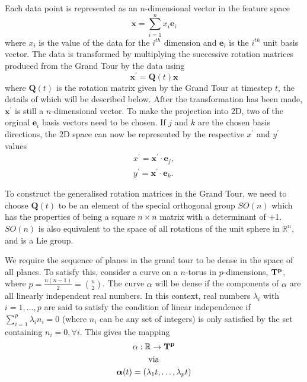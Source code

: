 \documentclass[a4paper,11pt,twoside]{article}
\begin{document}
Each data point is represented as an $n$-dimensional vector in the feature space
\begin{equation}
\bm{x}=\sum_{i=1}^n x_i \bm{e}_i 
\end{equation}
where $x_i$ is the value of the data for the $i^{th}$ dimension and $\bm{e}_i$ is the $i^{th}$ unit basis vector. The data is transformed by multiplying the successive rotation matrices produced from the Grand Tour by the data using
\begin{equation}
\bm{x}^\prime = \bm{Q}(t) \bm{x}
\end{equation}
where $\bm{Q}(t)$ is the rotation matrix given by the Grand Tour at timestep $t$, the details of which will be described below. After the transformation has been made, $\bm{\underline{x}}^\prime$ is still a $n$-dimensional vector. To make the projection into 2D, two of the orginal $\bm{e}_i$ basis vectors need to be chosen. If $j$ and $k$ are the chosen basis directions, the 2D space can now be represented by the respective $x^{\prime}$ and $y^{\prime}$ values
\begin{equation}
\begin{split}
x^{\prime}=\bm{x}^\prime\cdot\bm{e}_j, 
\\
y^{\prime}=\bm{x}^\prime\cdot\bm{e}_k.
\end{split}
\end{equation}

To construct the generalised rotation matrices in the Grand Tour, we need to choose $\bm{Q}(t)$ to be an element of the special orthogonal group $SO(n)$ which has the properties of being a square $n\times n$ matrix with a determinant of +1. $SO(n)$ is also equivalent to the space of all rotations of the unit sphere in $\mathbb{R}^n$, and is a Lie group.
\newline

We require the sequence of planes in the grand tour to be dense in the space of all planes. To satisfy this, consider a curve on a $n$-torus in $p$-dimensions, $\bf{T}^p$, where $p=\frac{n(n-1)}{2}={n \choose 2} $. The curve $\alpha$ will be dense if the components of $\alpha$ are all linearly independent real numbers. In this context, real numbers $\lambda_i$ with  $i=1,\dotsc,p$ are said to satisfy the condition of linear independence if $\sum_{i=1}^p \lambda_i n_i=0$ (where $n_i$ can be any set of integers) is only satisfied by the set containing $n_i=0, \forall i$. This gives the mapping
\begin{equation}
\begin{gathered}
\alpha: \mathbb R \rightarrow \bf{T}^p
\\
\text{via}
\\
\bm{\alpha}(t)=(\lambda_1 t,\dotsc, \lambda_p t)
\end{gathered}
\end{equation}
\end{document}
